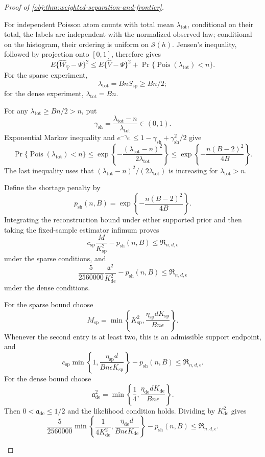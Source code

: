 \begin{proof}[Proof of \cref{obj:thm:weighted-separation-and-frontier}]
\begin{enumerate}
For independent Poisson atom counts with total mean
\(\lambda_{\mathrm{tot}}\), conditional on their total, the labels are independent with the normalized observed law; conditional on the histogram, their ordering is uniform on \(\mathcal S(h)\). Jensen's inequality, followed by projection onto \([0,1]\), therefore gives
\[
E\{\widehat W_{\widehat V}-\Psi\}^2
\le E\{\widehat V-\Psi\}^2
+\Pr\{\operatorname{Pois}(\lambda_{\mathrm{tot}})<n\}.
\]
For the sparse experiment,
\[
\lambda_{\mathrm{tot}}=BnS_{\mathrm{sp}}\ge Bn/2;
\]
for the dense experiment, \(\lambda_{\mathrm{tot}}=Bn\).

For any \(\lambda_{\mathrm{tot}}\ge Bn/2>n\), put
\[
\gamma_{\mathrm{sh}}
=\frac{\lambda_{\mathrm{tot}}-n}{\lambda_{\mathrm{tot}}}\in(0,1).
\]
Exponential Markov inequality and
\(e^{-\gamma_{\mathrm{sh}}}
\le1-\gamma_{\mathrm{sh}}+\gamma_{\mathrm{sh}}^2/2\) give
\[
\Pr\{\operatorname{Pois}(\lambda_{\mathrm{tot}})<n\}
\le
\exp\left\{-\frac{(\lambda_{\mathrm{tot}}-n)^2}
                       {2\lambda_{\mathrm{tot}}}\right\}
\le
\exp\left\{-\frac{n(B-2)^2}{4B}\right\}.
\]
The last inequality uses that
\((\lambda_{\mathrm{tot}}-n)^2/(2\lambda_{\mathrm{tot}})\)
is increasing for \(\lambda_{\mathrm{tot}}>n\).

Define the shortage penalty by
\[
p_{\mathrm{sh}}(n,B)
=\exp\left\{-\frac{n(B-2)^2}{4B}\right\}.
\]
Integrating the reconstruction bound under either supported prior and then taking the fixed-sample estimator infimum proves
\[
c_{\mathrm{sp}}\frac M{K_{\mathrm{sp}}^2}
-p_{\mathrm{sh}}(n,B)
\le\mathfrak R_{n,d,\epsilon}
\]
under the sparse conditions, and
\[
\frac5{2560000}\frac{\mathfrak a^2}{K_{\mathrm{de}}^2}
-p_{\mathrm{sh}}(n,B)
\le\mathfrak R_{n,d,\epsilon}
\]
under the dense conditions.

For the sparse bound choose
\[
M_{\mathrm{sp}}
=\min\left\{
K_{\mathrm{sp}}^2,
\frac{\eta_{\mathrm{sp}}dK_{\mathrm{sp}}}{Bn\epsilon}
\right\}.
\]
Whenever the second entry is at least two, this is an admissible support endpoint, and
\[
c_{\mathrm{sp}}
\min\left\{1,\frac{\eta_{\mathrm{sp}}d}
                    {Bn\epsilon K_{\mathrm{sp}}}\right\}
-p_{\mathrm{sh}}(n,B)
\le\mathfrak R_{n,d,\epsilon}.
\]
For the dense bound choose
\[
\mathfrak a_{\mathrm{de}}^2
=\min\left\{\frac14,
\frac{\eta_{\mathrm{de}}dK_{\mathrm{de}}}{Bn\epsilon}\right\}.
\]
Then \(0<\mathfrak a_{\mathrm{de}}\le1/2\) and the likelihood condition holds. Dividing by \(K_{\mathrm{de}}^2\) gives
\[
\frac5{2560000}
\min\left\{
\frac1{4K_{\mathrm{de}}^2},
\frac{\eta_{\mathrm{de}}d}{Bn\epsilon K_{\mathrm{de}}}
\right\}
-p_{\mathrm{sh}}(n,B)
\le\mathfrak R_{n,d,\epsilon}.
\]


\end{enumerate}
\end{proof}
